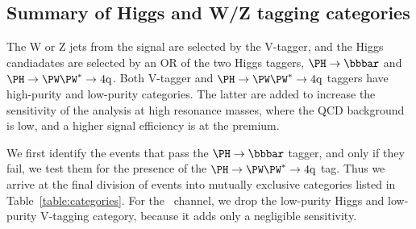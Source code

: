 \subsection{Summary of Higgs and W/Z tagging categories}
\label{sec:total}

The W or Z jets from the signal are selected by the
V-tagger, and the Higgs candiadates are selected by an OR of the two
Higgs taggers, $\Hbb$ and $\Hww$.  Both V-tagger and $\Hww$ taggers
have high-purity and
low-purity categories.  The latter are added to increase the
sensitivity of the analysis at high resonance masses, where the QCD
background is low, and a higher signal efficiency is at the premium.

We first identify the
events that pass the $\Hbb$ tagger, and only if they fail,  we
test them for the presence of the $\Hww$ tag.
Thus we arrive at the final division of events into mutually exclusive
categories listed in Table~\ref{table:categories}.
For the \HwwVqq\ channel, we drop the
low-purity Higgs and low-purity V-tagging category, because it
adds only a negligible sensitivity.


